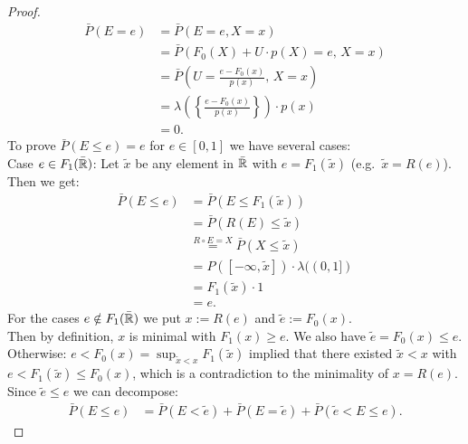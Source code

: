 \begin{Lem}
\begin{proof}
\begin{align*}
     \bar P(E=e) &= \bar P(E=e,X=x)\\
                  &= \bar P( F_0(X) + U \cdot p(X) = e,\,   X=x) \\
                  &= \bar P\left( U = \frac{e-F_0(x)}{p(x)},\, X=x \right)  \\
                  &= \lambda\left(\left\{ \frac{e-F_0(x)}{p(x)}\right\}\right)\cdot p(x) \\
                  &= 0.
 \end{align*}
%
 To prove $\bar P(E \le e) =e$ for $e \in [0,1]$ we have several cases:\\
%
Case $e \in F_1(\bar{\mathbb{R}})$: 
 Let $\tilde x$ be any element in $\bar{\mathbb{R}}$ with $e=F_1(\tilde x)$ (e.g.\ $\tilde x= R(e)$). Then we get:
\begin{align*}
    \bar P(E \le e) &= \bar P( E \le F_1(\tilde x) ) \\
                 &= \bar P(  R(E) \le \tilde x ) \\
    &\stackrel{R \circ E = X}{=} \bar P( X \le \tilde x ) \\
    &= P([-\infty,\tilde x]) \cdot \lambda((0,1]) \\
    &= F_1(\tilde x) \cdot 1 \\
    &= e.
\end{align*}
%
For the cases $e \notin F_1(\bar{\mathbb{R}})$ we put $x:=R(e)$ and $\tilde e:=F_0(x)$. \\
    Then by definition, $x$ is minimal with $F_1(x) \ge e$. 
    We also have $\tilde e = F_0(x) \le e$.
    Otherwise: %
    $e < F_0(x) = \sup_{\tilde x < x} F_1(\tilde x)$ 
    implied that there existed $\tilde x < x$  with $e<F_1(\tilde x) \le F_0(x)$, which is a contradiction to the minimality of $x=R(e)$. 
%
 Since $\tilde e \le e$ we can decompose:
    \begin{align*}
  \bar P(E \le e) &= \bar P(E < \tilde e) + \bar P(E=\tilde e) + \bar P(\tilde e< E \le e).
    \end{align*}

\end{proof}
\end{Lem}
